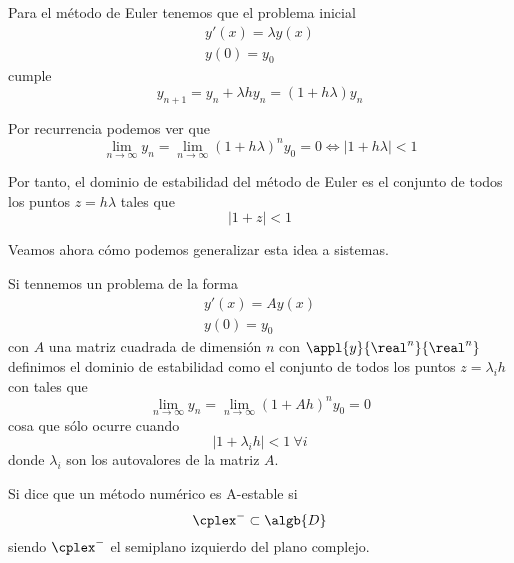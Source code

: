 \begin{example}
Para el método de Euler tenemos que el problema inicial
\[\begin{array}{l}
y'(x)=λy(x) \\
y(0) = y_0
\end{array}\]
cumple
\[y_{n+1}=y_n+λhy_n = (1+hλ)y_n\]

Por recurrencia podemos ver que
\[\lim_{n \to \infty}y_n=\lim_{n \to \infty}(1+hλ)^ny_0 = 0 \iff |1+hλ| < 1\]

Por tanto, el dominio de estabilidad del método de Euler es el conjunto de todos los puntos $z=hλ$ tales que
\[|1+z|<1\]

\end{example}

Veamos ahora cómo podemos generalizar esta idea a sistemas.

\begin{defn}
Si tennemos un problema de la forma
\[\begin{array}{l}
y'(x)=Ay(x) \\
y(0) = y_0
\end{array}\]
con $A$ una matriz cuadrada de dimensión $n$ con $\appl{y}{\real^n}{\real^n}$ definimos el dominio de estabilidad como el conjunto de todos los puntos $z=λ_ih$ con tales que
\[\lim_{n \to \infty} y_n = \lim_{n \to \infty}(1+Ah)^ny_0 = 0\]
cosa que sólo ocurre cuando
\[|1+λ_ih|<1 \ \forall i\]
donde $λ_i$ son los autovalores de la matriz $A$.
\end{defn}

\begin{defn}[A-estabilidad]
Si dice que un método numérico es A-estable si
\[\cplex^{-}\subset \algb{D}\]
siendo $\cplex^{-}$ el semiplano izquierdo del plano complejo.
\end{defn}